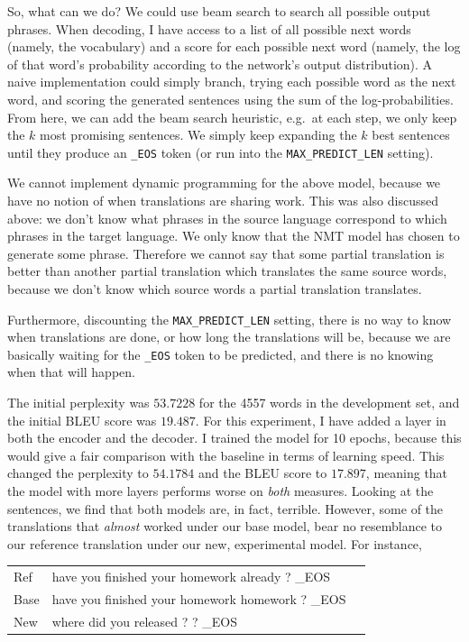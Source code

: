 \documentclass[answers]{exam}
\begin{document}
\begin{CJK}{UTF8}{min}
\begin{questions}
\begin{framed}
\begin{compactenum}[1.]
    So, what can we do? We could use beam search to search all possible
    output phrases. When decoding, I have access to a list of all possible next
    words (namely, the vocabulary) and a score for each possible next word
    (namely, the log of that word's probability according to the network's
    output distribution). A naive implementation could simply branch, trying
    each possible word as the next word, and scoring the generated sentences
    using the sum of the log-probabilities.
    From here, we can add the beam search heuristic, e.g.\ at each step, we only
    keep the $k$ most promising sentences. We simply keep expanding the $k$ best
    sentences until they produce an \texttt{\_EOS} token (or run into the
    \texttt{MAX\_PREDICT\_LEN} setting).
  \item
    We cannot implement dynamic programming for the above model, because we have
    no notion of when translations are sharing work. This was also discussed
    above: we don't know what phrases in the source language correspond to which
    phrases in the target language. We only know that the NMT model has chosen
    to generate some phrase. Therefore we cannot say that some partial
    translation is better than another partial translation which translates the
    same source words, because we don't know which source words a partial
    translation translates. 
    
    Furthermore, discounting the \texttt{MAX\_PREDICT\_LEN} setting, there is no
    way to know when translations are done, or how long the translations will
    be, because we are basically waiting for the \texttt{\_EOS} token to be
    predicted, and there is no knowing when that will happen. 
\end{compactenum}
\end{framed}


\begin{framed}
  The initial perplexity was $53.7228$ for the 4557 words in the development
  set, and the initial BLEU score was $19.487$. For this experiment, I have
  added a layer in both the encoder and the decoder. I trained the model for
  10 epochs, because this would give a fair comparison with the baseline in
  terms of learning speed.
  This changed the perplexity to $54.1784$ and the BLEU score to $17.897$,
  meaning that the model with more layers performs worse on \emph{both}
  measures. 
  Looking at the sentences, we find that both models are, in fact, terrible.
  However, some of the translations that \emph{almost} worked under our base
  model, bear no resemblance to our reference translation under our new,
  experimental model. For instance,
  \begin{tabular}{lll}
    Ref & have you finished your homework already ? \_EOS  \\
    Base& have you finished your homework homework ? \_EOS \\
    New & where did you released ? ? \_EOS
  \end{tabular}
\end{framed}



\end{questions}
\end{CJK}
\end{document}
